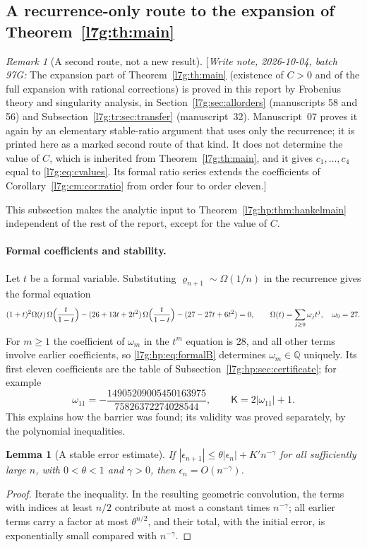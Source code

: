 \documentclass[11pt,letterpaper]{article}
\newtheorem{lemma}[theorem]{Lemma}
\theoremstyle{remark}\newtheorem{remark}[theorem]{Remark}
\newcommand{\Q}{\mathbb Q}\newcommand{\tht}{\vartheta}
\newcommand{\hpnote}[1]{\textup{[}\emph{Write note, 2026-10-04, batch 97G:} #1\textup{]}}
\newcounter{l7gtrsavedeq}
\begin{document}
\subsection{A recurrence-only route to the expansion of Theorem~\ref{l7g:th:main}}\label{l7g:hp:sec:sequenceasympt}
\begin{remark}[A second route, not a new result]\label{l7g:hp:rem:secondroute}
\hpnote{The expansion part of Theorem~\ref{l7g:th:main} (existence of $C>0$
and of the full expansion with rational corrections) is proved in this
report by Frobenius theory and singularity analysis, in
Section~\ref{l7g:sec:allorders} (manuscripts 58 and 56) and
Subsection~\ref{l7g:tr:sec:transfer} (manuscript~32). Manuscript~07
proves it again by an elementary stable-ratio argument that uses only the
recurrence; it is printed here as a marked second route of that kind. It
does not determine the value of $C$, which is inherited from
Theorem~\ref{l7g:th:main}, and it gives $c_1,\dots,c_4$ equal to
\eqref{l7g:eq:cvalues}. Its formal ratio series extends the coefficients of
Corollary~\ref{l7g:cm:cor:ratio} from order four to order eleven.}
\end{remark}
This subsection makes the analytic input to
Theorem~\ref{l7g:hp:thm:hankelmain} independent of the rest of the
report, except for the value of $C$.

\paragraph{Formal coefficients and stability.}
Let $t$ be a formal variable. Substituting $\varrho_{n+1}\sim\Omega(1/n)$
in the recurrence gives the formal equation
\begin{equation}\label{l7g:hp:eq:formalB}
 (1+t)^2\Omega(t)\,\Omega\Bigl(\frac{t}{1-t}\Bigr)
 -(26+13t+2t^2)\,\Omega\Bigl(\frac{t}{1-t}\Bigr)-(27-27t+6t^2)=0,
 \qquad \Omega(t)=\sum_{j\ge0}\omega_jt^j,\quad\omega_0=27.
\end{equation}
For $m\ge1$ the coefficient of $\omega_m$ in the $t^m$ equation is $28$,
and all other terms involve earlier coefficients, so
\eqref{l7g:hp:eq:formalB} determines $\omega_m\in\Q$ uniquely. Its first
eleven coefficients are the table of
Subsection~\ref{l7g:hp:sec:certificate}; for example
\[
 \omega_{11}=-\frac{14905209005450163975}{75826372274028544},
 \qquad \mathsf K=2|\omega_{11}|+1.
\]
This explains how the barrier was found; its validity was proved
separately, by the polynomial inequalities.

\begin{lemma}[A stable error estimate]\label{l7g:hp:lem:stable}
If $|\epsilon_{n+1}|\le\theta|\epsilon_n|+K'n^{-\gamma}$ for all
sufficiently large $n$, with $0<\theta<1$ and $\gamma>0$, then
$\epsilon_n=O(n^{-\gamma})$.
\end{lemma}
\begin{proof}
Iterate the inequality. In the resulting geometric convolution, the terms
with indices at least $n/2$ contribute at most a constant times
$n^{-\gamma}$; all earlier terms carry a factor at most $\theta^{n/2}$, and
their total, with the initial error, is exponentially small compared with
$n^{-\gamma}$.
\end{proof}
\end{document}

